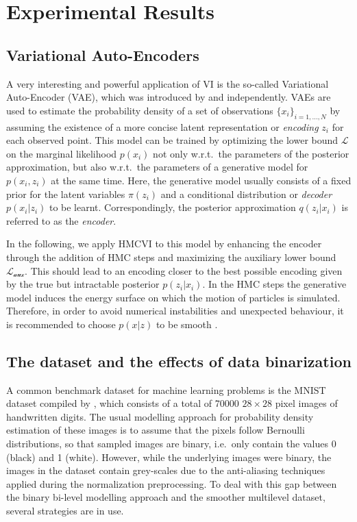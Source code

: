 \section{Experimental Results}
\label{sec:Experiments}
\subsection{Variational Auto-Encoders}

A very interesting and powerful application of VI is the so-called Variational Auto-Encoder (VAE), which was introduced by \textcite{Kingma2014} and \textcite{Rezende2014} independently. VAEs are used to estimate the probability density of a set of observations $\{x_i\}_{i=1, \dots, N}$ by assuming the existence of a more concise latent representation or \textit{encoding} $z_i$ for each observed point. This model can be trained by optimizing the lower bound $\mathcal{L}$ on the marginal likelihood $p(x_i)$ not only w.r.t.\ the parameters of the posterior approximation, but also w.r.t.\ the parameters of a generative model for $p(x_i, z_i)$ at the same time. Here, the generative model usually consists of a fixed prior for the latent variables $\pi(z_i)$ and a conditional distribution or \textit{decoder} $p(x_i|z_i)$ to be learnt. Correspondingly, the posterior approximation $q(z_i|x_i)$ is referred to as the \textit{encoder}.

In the following, we apply HMCVI to this model by enhancing the encoder through the addition of HMC steps and maximizing the auxiliary lower bound $\mathcal{L_\textrm{aux}}$. This should lead to an encoding closer to the best possible encoding given by the true but intractable posterior $p(z_i|x_i)$. In the HMC steps the generative model induces the energy surface on which the motion of particles is simulated. Therefore, in order to avoid numerical instabilities and unexpected behaviour, it is recommended to choose $p(x|z)$ to be smooth .

\subsection{The dataset and the effects of data binarization}
\label{sec:Dataset}
A common benchmark dataset for machine learning problems is the MNIST dataset compiled by \textcite{LeCun1998}, which consists of a total of 70000 $28 \times 28$ pixel images of handwritten digits. The usual modelling approach for probability density estimation of these images is to assume that the pixels follow Bernoulli distributions, so that sampled images are binary, i.e.\ only contain the values 0 (black) and 1 (white). However, while the underlying images were binary, the images in the dataset contain grey-scales due to the anti-aliasing techniques applied during the normalization preprocessing. To deal with this gap between the binary bi-level modelling approach and the smoother multilevel dataset, several strategies are in use.

